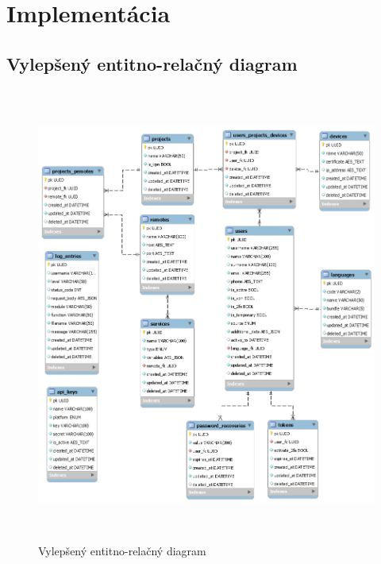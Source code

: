 \chapter{Implementácia}\label{ch:implementácia}

\section{Vylepšený entitno-relačný diagram}\label{sec:eer-diagram}

\begin{figure}[H]
\begin{center}\includegraphics[width=\textwidth,height=15cm,keepaspectratio=true]{assets/eer_diagram.png}\end{center}
\caption[Vylepšený entitno-relačný diagram]{Vylepšený entitno-relačný diagram}\label{fig:obr_13}
\end{figure}
